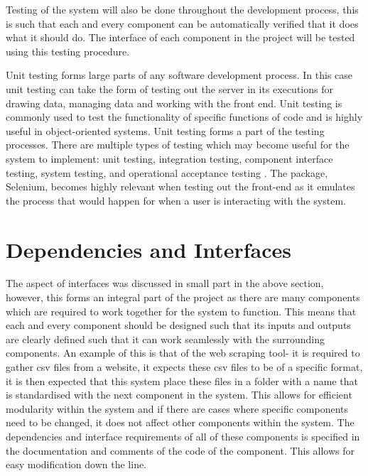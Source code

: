\documentclass[12pt,onecolumn]{IEEEtran}
\begin{document}

Testing of the system will also be done throughout the development process, this is such that each and every component can be automatically verified that it does what it should do. 
The interface of each component in the project will be tested using this testing procedure. 

Unit testing forms large parts of any software development process. In this case unit testing can take the form of testing out the server in its executions for drawing data, managing data and working with the front end.
Unit testing is commonly used to test the functionality of specific functions of code and is highly useful in object-oriented systems. Unit testing forms a part of the testing processes. There are multiple types of testing which may become useful for the system to implement: unit testing, integration testing, component interface testing, system testing, and operational acceptance testing \cite{swebok}.
The package, Selenium, becomes highly relevant when testing out the front-end as it emulates the process that would happen for when a user is interacting with the system. 



\section{Dependencies and Interfaces} \label{sec:DependenciesInterfaces}
The aspect of interfaces was discussed in small part in the above section, however, this forms an integral part of the project as there are many components which are required to work together for the system to function. 
This means that each and every component should be designed such that its inputs and outputs are clearly defined such that it can work seamlessly with the surrounding components. 
An example of this is that of the web scraping tool- it is required to gather csv files from a website, it expects these csv files to be of a specific format, it is then expected that this system place these files in a folder with a name that is standardised with the next component in the system. 
This allows for efficient modularity within the system and if there are cases where specific components need to be changed, it does not affect other components within the system.
The dependencies and interface requirements of all of these components is specified in the documentation and comments of the code of the component. This allows for easy modification down the line. 
\end{document}
